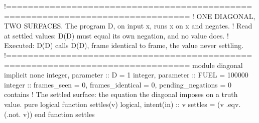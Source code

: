 \documentclass[10pt,twocolumn]{article}
\newenvironment{Shaded}{}{}
\newcommand{\CommentTok}[1]{#1}
\newcommand{\DataTypeTok}[1]{#1}
\newcommand{\DecValTok}[1]{#1}
\newcommand{\KeywordTok}[1]{#1}
\newcommand{\NormalTok}[1]{#1}
\newcommand{\OperatorTok}[1]{#1}
\providecommand{\CommentTok}[1]{#1}
\providecommand{\DataTypeTok}[1]{#1}
\providecommand{\DecValTok}[1]{#1}
\providecommand{\KeywordTok}[1]{#1}
\providecommand{\NormalTok}[1]{#1}
\providecommand{\OperatorTok}[1]{#1}
\providecommand{\CommentTok}[1]{#1}
\providecommand{\DataTypeTok}[1]{#1}
\providecommand{\DecValTok}[1]{#1}
\providecommand{\KeywordTok}[1]{#1}
\providecommand{\NormalTok}[1]{#1}
\providecommand{\OperatorTok}[1]{#1}
\begin{document}
\begin{strip}
\begin{Shaded}
\begin{Highlighting}[]
\CommentTok{!===============================================================================}
\CommentTok{!  ONE DIAGONAL, TWO SURFACES. The program D, on input x, runs x on x and negates.}
\CommentTok{!  Read at settled values: D(D) must equal its own negation, and no value does.}
\CommentTok{!  Executed: D(D) calls D(D), frame identical to frame, the value never settling.}
\CommentTok{!===============================================================================}
\KeywordTok{module}\NormalTok{ diagonal}
  \KeywordTok{implicit} \KeywordTok{none}
  \DataTypeTok{integer}\NormalTok{, }\DataTypeTok{parameter} \DataTypeTok{::}\NormalTok{ D }\KeywordTok{=} \DecValTok{1}
  \DataTypeTok{integer}\NormalTok{, }\DataTypeTok{parameter} \DataTypeTok{::}\NormalTok{ FUEL }\KeywordTok{=} \DecValTok{100000}
  \DataTypeTok{integer} \DataTypeTok{::}\NormalTok{ frames\_seen }\KeywordTok{=} \DecValTok{0}\NormalTok{, frames\_identical }\KeywordTok{=} \DecValTok{0}\NormalTok{, pending\_negations }\KeywordTok{=} \CommentTok{0}
\CommentTok{contains}
  \CommentTok{! The settled surface: the equation the diagonal imposes on a truth value.}
  \KeywordTok{pure} \DataTypeTok{logical} \KeywordTok{function}\NormalTok{ settles(v)}
    \DataTypeTok{logical}\NormalTok{, }\DataTypeTok{intent(in)} \DataTypeTok{::}\NormalTok{ v}
\NormalTok{    settles }\KeywordTok{=}\NormalTok{ (v }\OperatorTok{.eqv.}\NormalTok{ (}\OperatorTok{.not.}\NormalTok{ v))}
  \KeywordTok{end function}\NormalTok{ settles}


\end{Highlighting}
\end{Shaded}
\end{strip}
\end{document}
